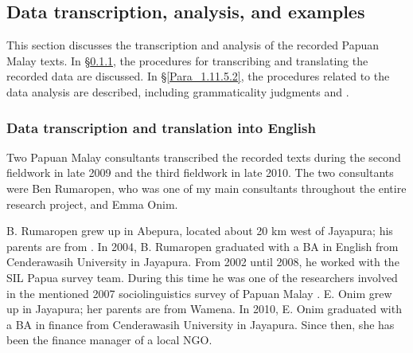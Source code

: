 {\subsection{Data transcription, analysis, and examples}\label{Para_1.11.5}
This section discusses the transcription and analysis of the recorded Papuan Malay texts. In §\ref{Para_1.11.5.1}, the procedures for transcribing and translating the recorded data are discussed. In §\ref{Para_1.11.5.2}, the procedures related to the data analysis are described, including grammaticality judgments and .


\subsubsection[Data transcription and translation into English]{Data transcription and translation into English}\label{Para_1.11.5.1}
Two Papuan Malay consultants transcribed the recorded texts during the second fieldwork in late 2009 and the third fieldwork in late 2010. The two consultants were Ben Rumaropen, who was one of my main consultants throughout the entire research project, and Emma Onim.



B. Rumaropen grew up in Abepura, located about 20 km west of Jayapura; his parents are from . In 2004, B. Rumaropen graduated with a BA in English from Cenderawasih University in Jayapura. From 2002 until 2008, he worked with the SIL Papua survey team. During this time he was one of the researchers involved in the mentioned 2007 sociolinguistics survey of Papuan Malay \citep{Scott.2008}. E. Onim grew up in Jayapura; her parents are from Wamena. In 2010, E. Onim graduated with a BA in finance from Cenderawasih University in Jayapura. Since then, she has been the finance manager of a local NGO.

}
